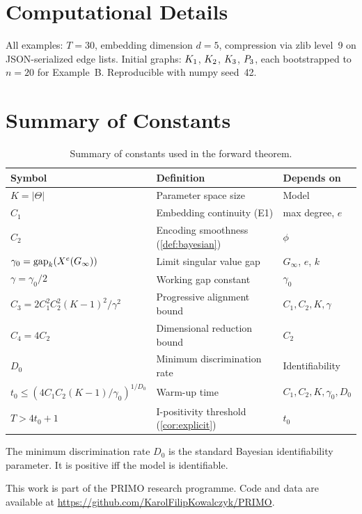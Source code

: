 \documentclass{../shared/primo}
\begin{document}
\section{Computational Details}
\label{app:computational}

All examples: $T = 30$, embedding dimension $d = 5$, compression via zlib level~9 on JSON-serialized edge lists. Initial graphs: $K_{1}$, $K_{2}$, $K_{3}$, $P_{3}$, each bootstrapped to $n = 20$ for Example~B. Reproducible with numpy seed~42.

\section{Summary of Constants}
\label{app:constants}

\begin{table}[ht]
\centering
\small
\begin{tabular}{lll}
\toprule
Symbol & Definition & Depends on \\
\midrule
$K = |\Theta|$ & Parameter space size & Model \\
$C_1$ & Embedding continuity (E1) & max degree, $e$ \\
$C_2$ & Encoding smoothness (\cref{def:bayesian}) & $\phi$ \\
$\gamma_0 = \mathrm{gap}_k(X^e(G_\infty))$ & Limit singular value gap & $G_\infty$, $e$, $k$ \\
$\gamma = \gamma_0/2$ & Working gap constant & $\gamma_0$ \\
$C_3 = 2C_1^2 C_2^2 (K{-}1)^2/\gamma^2$ & Progressive alignment bound & $C_1, C_2, K, \gamma$ \\
$C_4 = 4C_2$ & Dimensional reduction bound & $C_2$ \\
$D_0$ & Minimum discrimination rate & Identifiability \\
$t_0 \leq (4C_1 C_2(K{-}1)/\gamma_0)^{1/D_0}$ & Warm-up time & $C_1, C_2, K, \gamma_0, D_0$ \\
$T > 4t_0 + 1$ & I-positivity threshold (\cref{cor:explicit}) & $t_0$ \\
\bottomrule
\end{tabular}
\caption{Summary of constants used in the forward theorem.}
\label{tab:constants}
\end{table}

The minimum discrimination rate $D_0$ is the standard Bayesian identifiability parameter. It is positive iff the model is identifiable.


\begin{acknowledgments}
This work is part of the PRIMO research programme. Code and data are available at \url{https://github.com/KarolFilipKowalczyk/PRIMO}.
\end{acknowledgments}



\end{document}
